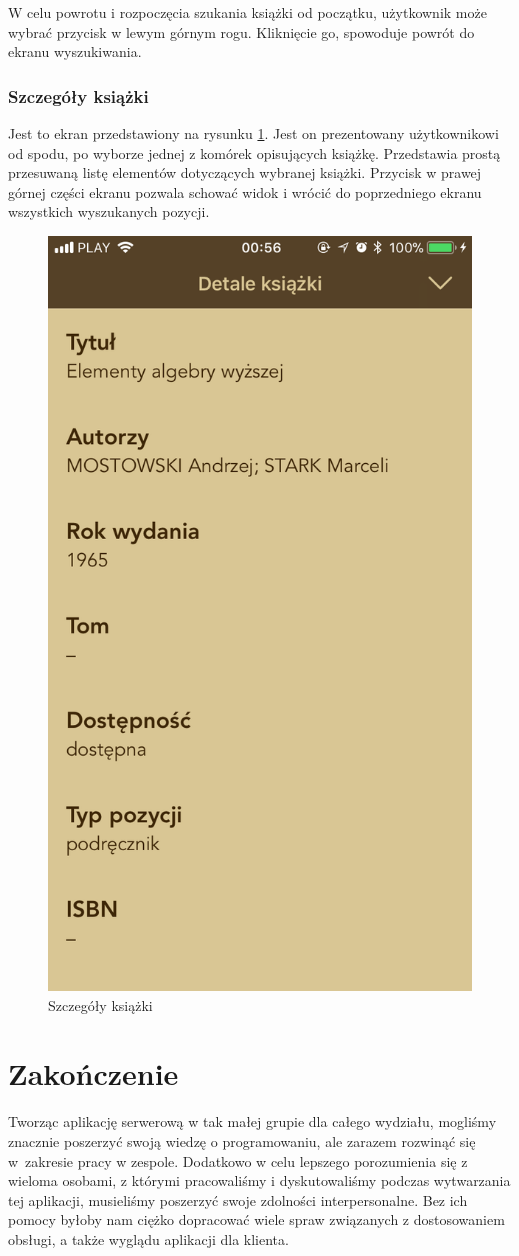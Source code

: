 \documentclass[twoside]{projektInzynierskiMS}
\begin{document}
W celu powrotu i rozpoczęcia szukania książki od początku, użytkownik może wybrać przycisk w lewym górnym rogu. Kliknięcie go, spowoduje powrót do ekranu wyszukiwania.

\subsubsection{Szczegóły książki}

Jest to ekran przedstawiony na rysunku \ref{fig:bookDetails}. Jest on prezentowany użytkownikowi od spodu, po wyborze jednej z komórek opisujących książkę. Przedstawia prostą przesuwaną listę elementów dotyczących wybranej książki. Przycisk w prawej górnej części ekranu pozwala schować widok i wrócić do poprzedniego ekranu wszystkich wyszukanych pozycji.

\begin{figure}[h]
  \centering
  \includegraphics[width=0.4\linewidth]{img/iOS/ios8.PNG}
  \caption{Szczegóły książki}
  \label{fig:bookDetails}
\end{figure}


\section{Zakończenie}

Tworząc aplikację serwerową w tak małej grupie dla całego wydziału, mogliśmy znacznie poszerzyć swoją wiedzę o programowaniu, ale zarazem rozwinąć się w~zakresie pracy w zespole. Dodatkowo w celu lepszego porozumienia się z wieloma osobami, z którymi pracowaliśmy i dyskutowaliśmy podczas wytwarzania tej aplikacji, musieliśmy poszerzyć swoje zdolności interpersonalne. Bez ich pomocy byłoby nam ciężko dopracować wiele spraw związanych z dostosowaniem obsługi, a także wyglądu aplikacji dla klienta.
\end{document}
